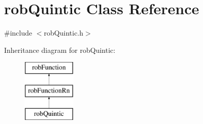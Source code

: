 \hypertarget{classrob_quintic}{\section{rob\-Quintic Class Reference}
\label{classrob_quintic}
}


{\ttfamily \#include $<$rob\-Quintic.\-h$>$}

Inheritance diagram for rob\-Quintic\-:\begin{figure}[H]
\begin{center}
\leavevmode
\includegraphics[height=3.000000cm]{da/da2/classrob_quintic}
\end{center}
\end{figure}
